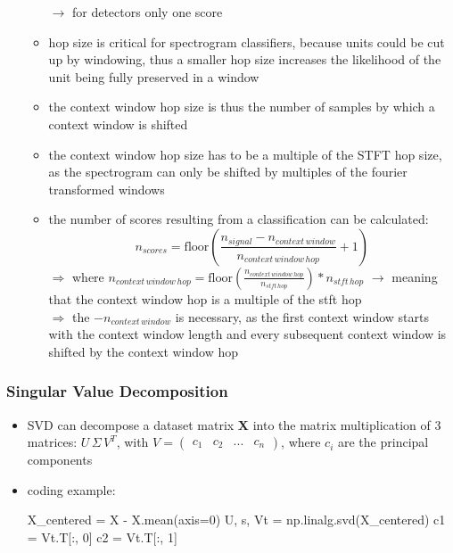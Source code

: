 \documentclass[12pt,a4paper]{article}
\begin{document}
\begin{itemize}
\begin{itemize}
    \newline \indent $\longrightarrow$ for detectors only one score
    \item hop size is critical for spectrogram classifiers, because units could be cut up by windowing, thus a smaller hop size increases the likelihood of the unit being fully preserved in a window
    \item the context window hop size is thus the number of samples by which a context window is shifted
    \item the context window hop size has to be a multiple of the STFT hop size, as the spectrogram can only be shifted by multiples of the fourier transformed windows
    \item the number of scores resulting from a classification can be calculated:
    \begin{equation}
      n_{scores} = \mathrm{floor}(\frac{n_{signal} - n_{context \, window}}{n_{context \, window \, hop}} +1 )
    \end{equation}
    $\Longrightarrow$ where $n_{context \, window \, hop} = \mathrm{floor}(\frac{n_{context \, window \, hop}}{n_{stft \, hop}}) * n_{stft \, hop}$ 
    \newline \indent $\longrightarrow$ meaning that the context window hop is a multiple of the stft hop \\
    $\Longrightarrow$ the $- n_{context \, window}$ is necessary, as the first context window starts with the context window length and every subsequent context window is shifted by the context window hop
  \end{itemize}
\end{itemize}
\subsubsection{Singular Value Decomposition} %
\label{ssub:singular_value_decomposition}
\begin{itemize}
  \item SVD can decompose a dataset matrix \textbf{X} into the matrix multiplication of 3 matrices: $U \, \Sigma \, V^T$, with $V = \begin{pmatrix}
    c_1 & c_2 & ... & c_n
  \end{pmatrix} $, where $c_i$ are the principal components
  \item coding example: 
  \begin{python}
    X_centered = X - X.mean(axis=0) 
    U, s, Vt = np.linalg.svd(X_centered)
    c1 = Vt.T[:, 0]
    c2 = Vt.T[:, 1]
  \end{python}
\end{itemize}
\end{document}
